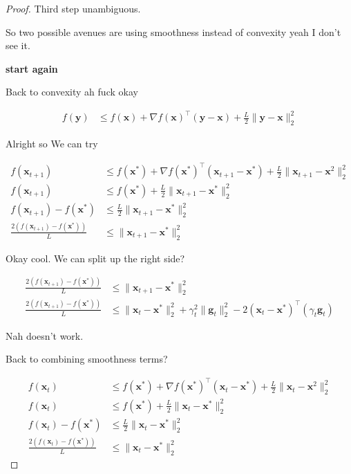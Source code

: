 \documentclass{article}
\begin{document}
\begin{proof}
	Third step unambiguous.
	
	So two possible avenues are using smoothness instead of convexity yeah I don't see it.
	
	
	\textbf{start again}
	
	Back to convexity ah fuck okay
	
	\begin{align}
		f(\mathbf{y}) &\le f(\mathbf{x}) + \nabla f(\mathbf{x})^\top (\mathbf{y}-\mathbf{x}) + \frac{L}{2}\|\mathbf{y} - \mathbf{x}\|^2_2
	\end{align}
	
	Alright so We can try
	
	\begin{align}
		f(\mathbf{x}_{t+1}) &\le f(\mathbf{x}^*) + \nabla f(\mathbf{x}^*)^\top (\mathbf{x}_{t+1}-\mathbf{x}^*) + \frac{L}{2}\|\mathbf{x}_{t+1} - \mathbf{x}^2\|^2_2\\
		f(\mathbf{x}_{t+1}) &\le f(\mathbf{x}^*)  + \frac{L}{2}\|\mathbf{x}_{t+1} - \mathbf{x}^*\|^2_2\\
		f(\mathbf{x}_{t+1}) - f(\mathbf{x}^*) &\le \frac{L}{2}\|\mathbf{x}_{t+1} - \mathbf{x}^*\|^2_2\\
		\frac{2(f(\mathbf{x}_{t+1}) - f(\mathbf{x}^*))}{L} &\le \|\mathbf{x}_{t+1} - \mathbf{x}^*\|^2_2
	\end{align}
	
	Okay cool. We can split up the right side?
	
	\begin{align}
		\frac{2(f(\mathbf{x}_{t+1}) - f(\mathbf{x}^*))}{L} &\le \|\mathbf{x}_{t+1} - \mathbf{x}^*\|^2_2\\
		\frac{2(f(\mathbf{x}_{t+1}) - f(\mathbf{x}^*))}{L} &\le \|\mathbf{x}_t-\mathbf{x}^*\|^2_2 + \gamma_t^2\| \mathbf{g}_t\|^2_2 - 2(\mathbf{x}_t-\mathbf{x}^*)^\top(\gamma_t \mathbf{g}_t)
	\end{align}
	
	Nah doesn't work. 
	
	Back to combining smoothness terms? 
	
	\begin{align}
		f(\mathbf{x}_{t}) &\le f(\mathbf{x}^*) + \nabla f(\mathbf{x}^*)^\top (\mathbf{x}_{t}-\mathbf{x}^*) + \frac{L}{2}\|\mathbf{x}_{t} - \mathbf{x}^2\|^2_2\\
		f(\mathbf{x}_{t}) &\le f(\mathbf{x}^*)  + \frac{L}{2}\|\mathbf{x}_{t} - \mathbf{x}^*\|^2_2\\
		f(\mathbf{x}_{t}) - f(\mathbf{x}^*) &\le \frac{L}{2}\|\mathbf{x}_{t} - \mathbf{x}^*\|^2_2\\
		\frac{2(f(\mathbf{x}_{t}) - f(\mathbf{x}^*))}{L} &\le \|\mathbf{x}_{t} - \mathbf{x}^*\|^2_2
	\end{align}
	

\end{proof}
\end{document}
